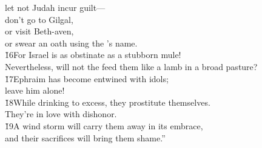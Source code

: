\begin{poetry}
\poemll    let not Judah incur guilt--- \\
\poeml don't go to Gilgal, \\
\poemll    or visit Beth-aven, \\
\poemlll       or swear an oath using the 's name. \\
\poeml \v{16}For Israel is as obstinate as a stubborn mule! \\
\poemll    Nevertheless, will not the  feed them like a lamb in a broad pasture? \\
\poeml \v{17}Ephraim has become entwined with idols; \\
\poemll    leave him alone! \\
\poeml \v{18}While drinking to excess, they prostitute themselves. \\
\poemll    They're in love with dishonor. \\
\poeml \v{19}A wind storm will carry them away in its embrace, \\
\poemll    and their sacrifices will bring them shame.''
\end{poetry}

